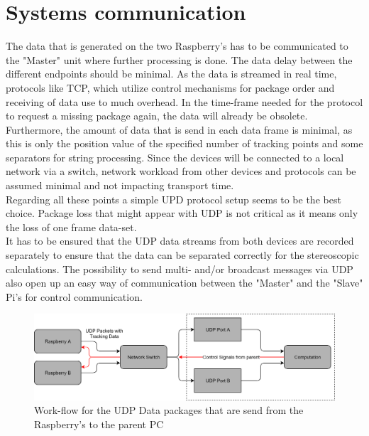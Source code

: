 \section{Systems communication}
The data that is generated on the two Raspberry's has to be communicated to the "Master" unit where further processing is done. The data delay between the different endpoints should be minimal. As the data is streamed in real time, protocols like TCP, which utilize control mechanisms for package order and receiving of data use to much overhead. In the time-frame needed for the protocol to request a missing package again, the data will already be obsolete. \\Furthermore, the amount of data that is send in each data frame is minimal, as this is only the position value of the specified number of tracking points and some separators for string processing. Since the devices will be connected to a local network via a switch, network workload from other devices and protocols can be assumed minimal and not impacting transport time.\\
Regarding all these points a simple UPD protocol setup seems to be the best choice. Package loss that might appear with UDP is not critical as it means only the loss of one frame data-set.\\
It has to be ensured that the UDP data streams from both devices are recorded separately to ensure that the data can be separated correctly for the stereoscopic calculations.
The possibility to send multi- and/or broadcast messages via UDP also open up an easy way of communication between the "Master" and the "Slave" Pi's for control communication.
\begin{figure}[H]
\includegraphics[width=\textwidth]{images/Network_Diagram.png}
\caption{Work-flow for the UDP Data packages that are send from the Raspberry's to the parent PC}
\label{img:netzwerk_diagram} 
\end{figure}
